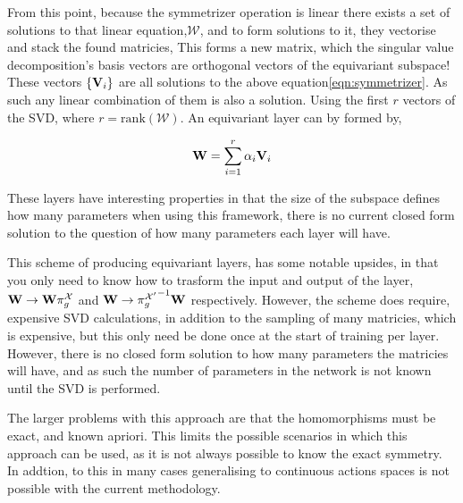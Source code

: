 From this point, because the symmetrizer operation is linear there exists a set of solutions to that linear equation,$\mathcal{W}$, and to form solutions to it, they vectorise and stack the found matricies, This forms a new matrix, which the singular value decomposition's basis vectors are orthogonal vectors of the equivariant subspace! These vectors $\{\mathbf{V}_i\}$ are all solutions to the above equation\ref{eqn:symmetrizer}. As such any linear combination of them is also a solution. Using the first $r$ vectors of the SVD, where $r= \text{rank}(\mathcal{W})$. An equivariant layer can by formed by,

\begin{equation}
	\mathbf{W} = \sum_{i=1}^{r}{\alpha_i\mathbf{V}_i}
\end{equation}

These layers have interesting properties in that the size of the subspace defines how many parameters when using this framework, there is no current closed form solution to the question of how many parameters each layer will have.

This scheme of producing equivariant layers, has some notable upsides, in that you only need to know how to trasform the input and output of the layer, $\mathbf{W} \rightarrow \mathbf{W}\pi_g^\mathcal{X}$ and $\mathbf{W} \rightarrow {\pi_g^{\mathcal{X}'}}^{-1} \mathbf{W}$ respectively. However, the scheme does require, expensive SVD calculations, in addition to the sampling of many matricies, which is expensive, but this only need be done once at the start of training per layer. However, there is no closed form solution to how many parameters the matricies will have, and as such the number of parameters in the network is not known until the SVD is performed.

The larger problems with this approach are that the homomorphisms must be exact, and known apriori. This limits the possible scenarios in which this approach can be used, as it is not always possible to know the exact symmetry. In addtion, to this in many cases generalising to continuous actions spaces is not possible with the current methodology.